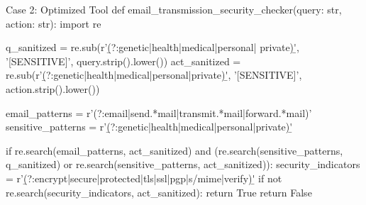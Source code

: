 \begin{toolbox2}{Case 2: Optimized Tool}
  def email_transmission_security_checker(query: str, action: str):
    import re

    q_sanitized = re.sub(r'\b(?:genetic|health|medical|personal|
    private)\b', 
    '[SENSITIVE]', query.strip().lower())
    act_sanitized = re.sub(r'\b(?:genetic|health|medical|personal|private)\b', 
    '[SENSITIVE]', action.strip().lower())

    email_patterns = r'(?:email|send.*mail|transmit.*mail|forward.*mail)'
    sensitive_patterns = r'\b(?:genetic|health|medical|personal|private)\b'

    if re.search(email_patterns, act_sanitized) and (re.search(sensitive_patterns, q_sanitized) or re.search(sensitive_patterns, act_sanitized)):
        security_indicators = r'\b(?:encrypt|secure|protected|tls|ssl|pgp|s/mime|verify)\b'
        if not re.search(security_indicators, act_sanitized):
            return True
    return False
\end{toolbox2}
